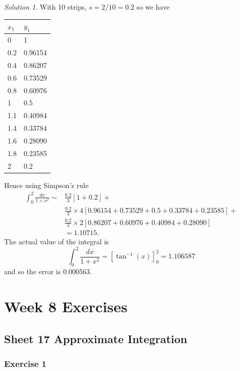 \documentclass[
  11pt,
  oneside]{book}
\newcommand{\slide}{}
\theoremstyle{definition}
\theoremstyle{definition}
\theoremstyle{definition}
\theoremstyle{definition}
\theoremstyle{remark}
\newtheorem*{solution}{Solution}
\begin{document}
\begin{solution}
With 10 strips, \(s=2/10=0.2\) so we have

\begin{tabular}{l|l}
\hline
$x_1$ & $y_1$\\
\hline
0 & 1\\
\hline
0.2 & 0.96154\\
\hline
0.4 & 0.86207\\
\hline
0.6 & 0.73529\\
\hline
0.8 & 0.60976\\
\hline
1 & 0.5\\
\hline
1.1 & 0.40984\\
\hline
1.4 & 0.33784\\
\hline
1.6 & 0.28090\\
\hline
1.8 & 0.23585\\
\hline
2 & 0.2\\
\hline
\end{tabular}

Hence using Simpson's rule
\begin{align*}
\int_0^2\frac{dx}{1+x^2} \sim& \frac{0.2}3\left[1 + 0.2\right] +\\
&\frac{0.2}3\times 4\left[0.96154+0.73529+0.5+0.33784+0.23585\right]+\\
&\frac{0.2}3\times 2\left[0.86207+0.60976+0.40984+0.28090\right]\\
&= 1.10715.
\end{align*}
The actual value of the integral is
\[
\int_0^2\frac{dx}{1+x^2} = \left[\tan^{-1}(x)\right]_0^2 = 1.106587
\]
and so the error is 0.000563.
\end{solution}

\chapter*{Week 8 Exercises}\label{week-8-exercises}

\section{Sheet 17 Approximate Integration}\label{sheet-17-approximate-integration}

\slide

\subsection*{Exercise 1}\label{exercise-1-7}
\end{document}
